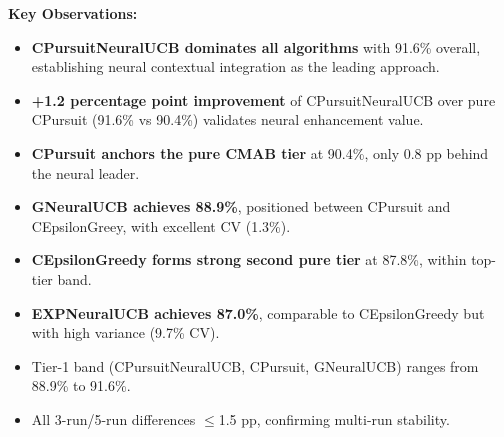 \documentclass[12pt,a4paper]{article}
\newcommand{\performance}[1]{\textcolor{performancecolor}{\textbf{#1}}}
\newcommand{\legacy}[1]{\textcolor{legacycolor}{\textbf{#1}}}
\newcommand{\neural}[1]{\textcolor{neuralcolor}{\textbf{#1}}}
\begin{document}
\begin{tcolorbox}[colback=performancecolor!10,colframe=performancecolor,title=\textbf{Primary Performance Results (All Aggregations)}]
\textbf{Key Observations:}
\begin{itemize}
\item \neural{CPursuitNeuralUCB dominates all algorithms} with 91.6\% overall, establishing neural contextual integration as the leading approach.
\item \neural{+1.2 percentage point improvement} of CPursuitNeuralUCB over pure CPursuit (91.6\% vs 90.4\%) validates neural enhancement value.
\item \performance{CPursuit anchors the pure CMAB tier} at 90.4\%, only 0.8 pp behind the neural leader.
\item \neural{GNeuralUCB achieves 88.9\%}, positioned between CPursuit and CEpsilonGreey, with excellent CV (1.3\%).
\item \performance{CEpsilonGreedy forms strong second pure tier} at 87.8\%, within top-tier band.
\item \legacy{EXPNeuralUCB achieves 87.0\%}, comparable to CEpsilonGreedy but with high variance (9.7\% CV).
\item Tier-1 band (CPursuitNeuralUCB, CPursuit, GNeuralUCB) ranges from 88.9\% to 91.6\%.
\item All 3-run/5-run differences $\leq$1.5 pp, confirming multi-run stability.
\end{itemize}

\end{tcolorbox}
\end{document}
